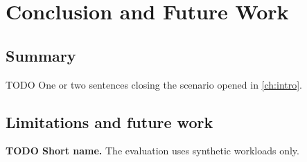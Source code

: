 \chapter{Conclusion and Future Work}\label{ch:conclusion}

\section{Summary}\label{sec:summary}
\begin{runningexample}[in retrospect]
TODO One or two sentences closing the scenario opened in \cref{ch:intro}.
\end{runningexample}

\section{Limitations and future work}\label{sec:future}

\begin{limitations}
  \item\label{lim:example} \textbf{TODO Short name.} The evaluation uses synthetic workloads only.
\end{limitations}

